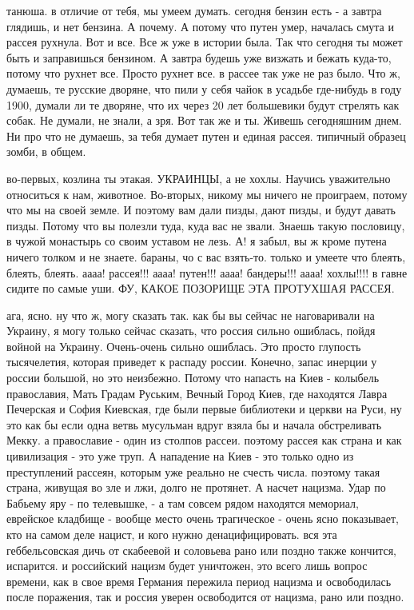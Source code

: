 танюша. в отличие от тебя, мы умеем думать. сегодня бензин есть - а завтра
глядишь, и нет бензина. А почему. А потому что путен умер, началась смута и
рассея рухнула. Вот и все. Все ж уже в истории была. Так что сегодня ты может
быть и заправишься бензином. А завтра будешь уже визжать и бежать куда-то,
потому что рухнет все. Просто рухнет все. в рассее так уже не раз было. Что ж,
думаешь, те русские дворяне, что пили у себя чайок в усадьбе где-нибудь в году
1900, думали ли те дворяне, что их через 20 лет большевики будут стрелять как
собак. Не думали, не знали, а зря. Вот так же и ты. Живешь сегодняшним днем. Ни
про что не думаешь, за тебя думает путен и единая рассея. типичный образец
зомби, в общем.

во-первых, козлина ты этакая. УКРАИНЦЫ, а не хохлы. Научись уважительно
относиться к нам, животное. Во-вторых, никому мы ничего не проиграем, потому
что мы на своей земле. И поэтому вам дали пизды, дают пизды, и будут давать
пизды. Потому что вы полезли туда, куда вас не звали. Знаешь такую пословицу, в
чужой монастырь со своим уставом не лезь. А! я забыл, вы ж кроме путена ничего
толком и не знаете. бараны, чо с вас взять-то. только и умеете что блеять,
блеять, блеять. аааа! рассея!!! аааа! путен!!! аааа! бандеры!!! аааа! хохлы!!!!
в гавне сидите по самые уши. ФУ, КАКОЕ ПОЗОРИЩЕ ЭТА ПРОТУХШАЯ РАССЕЯ.

ага, ясно. ну что ж, могу сказать так. как бы вы сейчас не наговаривали на
Украину, я могу только сейчас сказать, что россия сильно ошиблась, пойдя войной
на Украину. Очень-очень сильно ошиблась. Это просто глупость тысячелетия,
которая приведет к распаду россии. Конечно, запас инерции у россии большой, но
это неизбежно. Потому что напасть на Киев - колыбель православия, Мать Градам
Руським, Вечный Город Киев, где находятся Лавра Печерская и София Киевская, где
были первые библиотеки и церкви на Руси, ну это как бы если одна ветвь
мусульман вдруг взяла бы и начала обстреливать Мекку. а православие - один из
столпов рассеи. поэтому рассея как страна и как цивилизация - это уже труп. А
нападение на Киев - это только одно из преступлений рассеян, которым уже
реально не счесть числа. поэтому такая страна, живущая во зле и лжи, долго не
протянет. А насчет нацизма. Удар по Бабьему яру - по телевышке, - а там совсем
рядом находятся мемориал, еврейское кладбище - вообще место очень трагическое -
очень ясно показывает, кто на самом деле нацист, и кого нужно денацифицировать.
вся эта геббельсовская дичь от скабеевой и соловьева рано или поздно также
кончится, испарится. и российский нацизм будет уничтожен, это всего лишь вопрос
времени, как в свое время Германия пережила период нацизма и освободилась после
поражения, так и россия уверен освободится от нацизма, рано или поздно.

